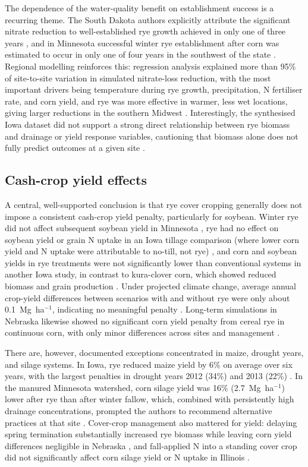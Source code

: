 \documentclass[11pt]{article}
\begin{document}
The dependence of the water-quality benefit on establishment success is a recurring theme. The South Dakota authors explicitly attribute the significant nitrate reduction to well-established rye growth achieved in only one of three years \parencite{Bawa2023}, and in Minnesota successful winter rye establishment after corn was estimated to occur in only one of four years in the southwest of the state \parencite{Strock2004}. Regional modelling reinforces this: regression analysis explained more than 95\% of site-to-site variation in simulated nitrate-loss reduction, with the most important drivers being temperature during rye growth, precipitation, N fertiliser rate, and corn yield, and rye was more effective in warmer, less wet locations, giving larger reductions in the southern Midwest \parencite{Malone2014b}. Interestingly, the synthesised Iowa dataset did not support a strong direct relationship between rye biomass and drainage or yield response variables, cautioning that biomass alone does not fully predict outcomes at a given site \parencite{MartinezFeria2016}.

\subsection{Cash-crop yield effects}
A central, well-supported conclusion is that rye cover cropping generally does not impose a consistent cash-crop yield penalty, particularly for soybean. Winter rye did not affect subsequent soybean yield in Minnesota \parencite{Strock2004}, rye had no effect on soybean yield or grain N uptake in an Iowa tillage comparison (where lower corn yield and N uptake were attributable to no-till, not rye) \parencite{Waring2020}, and corn and soybean yields in rye treatments were not significantly lower than conventional systems in another Iowa study, in contrast to kura-clover corn, which showed reduced biomass and grain production \parencite{Qi2011b}. Under projected climate change, average annual crop-yield differences between scenarios with and without rye were only about 0.1~Mg~ha$^{-1}$, indicating no meaningful penalty \parencite{Malone2020}. Long-term simulations in Nebraska likewise showed no significant corn yield penalty from cereal rye in continuous corn, with only minor differences across sites and management \parencite{Birru2023}.

There are, however, documented exceptions concentrated in maize, drought years, and silage systems. In Iowa, rye reduced maize yield by 6\% on average over six years, with the largest penalties in drought years 2012 (34\%) and 2013 (22\%) \parencite{MartinezFeria2016}. In the manured Minnesota watershed, corn silage yield was 16\% (2.7~Mg~ha$^{-1}$) lower after rye than after winter fallow, which, combined with persistently high drainage concentrations, prompted the authors to recommend alternative practices at that site \parencite{Krueger2013}. Cover-crop management also mattered for yield: delaying spring termination substantially increased rye biomass while leaving corn yield differences negligible in Nebraska \parencite{Birru2023}, and fall-applied N into a standing cover crop did not significantly affect corn silage yield or N uptake in Illinois \parencite{Lacey2015}.
\end{document}
